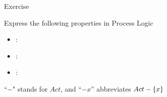 \documentclass{beamer}
\begin{document}
% 
%

\begin{slide}{Exercise}\label{s:25}
\small
\begin{exampleblock}{Express the following properties in Process Logic}
\begin{itemize}
\item {}: 
\item {}: 
\item {}: 
 \end{itemize}
 \end{exampleblock}

``$-$" stands for $Act$, and ``$-x$'' abbreviates $Act-\mathopen{ \{ }x\mathclose{ \} }$


\end{slide}
\end{document}
